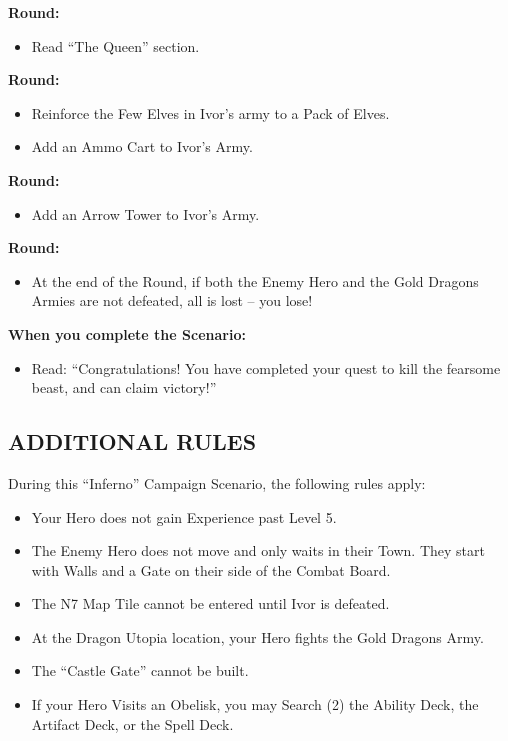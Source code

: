 \begin{multicols*}{2}
\textbf{ Round:}
\begin{itemize}
  \item Read ``The Queen'' section.
\end{itemize}

\textbf{ Round:}
\begin{itemize}
  \item Reinforce the Few Elves in Ivor's army to a Pack of Elves.
  \item Add an Ammo Cart to Ivor's Army.
\end{itemize}

\textbf{ Round:}
\begin{itemize}
  \item Add an Arrow Tower to Ivor's Army.
\end{itemize}

\textbf{ Round:}
\begin{itemize}
  \item At the end of the Round, if both the Enemy Hero and the Gold Dragons Armies are not defeated, all is lost -- you lose!
\end{itemize}

\textbf{When you complete the Scenario:}
\begin{itemize}
  \item Read: ``Congratulations! You have completed your quest to kill the fearsome beast, and can claim victory!''
\end{itemize}


\subsection*{\MakeUppercase{Additional Rules}}

During this ``Inferno'' Campaign Scenario, the following rules apply:

\begin{itemize}
    \item Your Hero does not gain Experience past Level 5.
    \item The Enemy Hero does not move and only waits in their Town. They start with Walls and a Gate on their side of the Combat Board.
    \item The N7 Map Tile cannot be entered until Ivor is defeated.
    \item At the Dragon Utopia location, your Hero fights the Gold Dragons Army.
    \item The ``Castle Gate'' cannot be built.
    \item If your Hero Visits an Obelisk, you may Search (2) the Ability Deck, the Artifact Deck, or the Spell Deck.
\end{itemize}


\end{multicols*}

